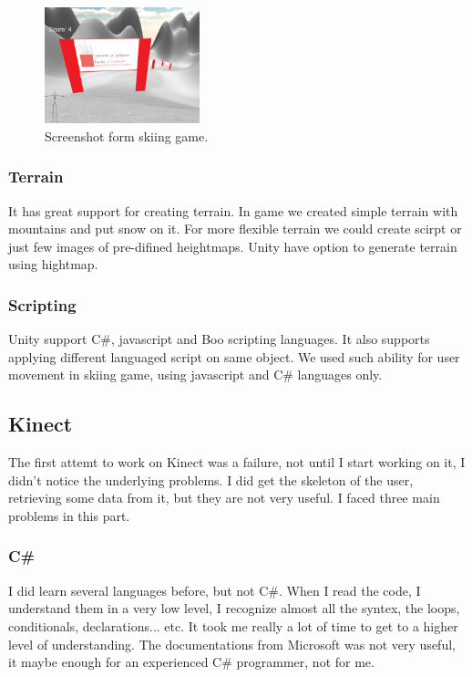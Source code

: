 \documentclass[fonts]{icst}
\begin{document}
\begin{figure}
    \centering
    \includegraphics[width=0.4\textwidth]{game.png}
    \caption{Screenshot form skiing game.}
    \label{fig:awesome_image}
\end{figure}

\subsubsection{Terrain}
It has great support for creating terrain. In game we created simple terrain with mountains and put snow on it. For more flexible terrain we could create scirpt or just few images of pre-difined heightmaps. Unity have option to generate terrain using hightmap.

\subsubsection{Scripting}
Unity support C\#, javascript and Boo scripting languages. It also supports applying different languaged script on same object. We used such ability for user movement in skiing game, using javascript and C\# languages only.




\subsection{Kinect}
The first attemt to work on Kinect was a failure, not until I start working on it, I didn't notice the underlying problems. I did get the skeleton of the user, retrieving some data from it, but they are not very useful. I faced three main problems in this part. 

\subsubsection{C\#}
I did learn several languages before, but not C\#. When I read the code, I understand them in a very low level, I recognize almost all the syntex, the loops, conditionals, declarations... etc. It took me really a lot of time to get to a higher level of understanding. The documentations from Microsoft was not very useful, it maybe enough for an experienced C\# programmer, not for me.
\end{document}
